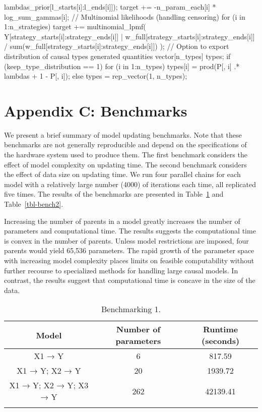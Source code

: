 \documentclass[
  11pt,
  article]{jss}
\begin{document}
\begin{CodeChunk}
\begin{CodeOutput}
{{                             lambdas_prior[l_starts[i]:l_ends[i]]);
    target += -n_param_each[i] * log_sum_gammas[i];
  }
  // Multinomial likelihoods (handling censoring)
  for (i in 1:n_strategies) {
    target += multinomial_lpmf(
      Y[strategy_starts[i]:strategy_ends[i]] |
      w_full[strategy_starts[i]:strategy_ends[i]] /
      sum(w_full[strategy_starts[i]:strategy_ends[i]])
    );
  }
}
// Option to export distribution of causal types
generated quantities {
  vector[n_types] types;
  if (keep_type_distribution == 1) {
    for (i in 1:n_types) {
      types[i] = prod(P[, i] .* lambdas + 1 - P[, i]);
    }
  } else {
    types = rep_vector(1, n_types);
  }
}
\end{CodeOutput}
\end{CodeChunk}

\newpage{}

\section*{Appendix C: Benchmarks}\label{sec-benchmark}

We present a brief summary of model updating benchmarks. Note that these
benchmarks are not generally reproducible and depend on the
specifications of the hardware system used to produce them. The first
benchmark considers the effect of model complexity on updating time. The
second benchmark considers the effect of data size on updating time. We
run four parallel chains for each model with a relatively large number
(4000) of iterations each time, all replicated five times. The results
of the benchmarks are presented in Table~\ref{tbl-bench1} and
Table~\ref{tbl-bench2}.

Increasing the number of parents in a model greatly increases the number
of parameters and computational time. The results suggests the
computational time is convex in the number of parents. Unless model
restrictions are imposed, four parents would yield 65,536 parameters.
The rapid growth of the parameter space with increasing model complexity
places limits on feasible computability without further recourse to
specialized methods for handling large causal models. In contrast, the
results suggest that computational time is concave in the size of the
data.

\begin{longtable}{ccc}

\toprule
Model & Number of parameters & Runtime (seconds)\\
\midrule
X1 → Y & 6 & 817.59\\
X1 → Y; X2 → Y & 20 & 1939.72\\
X1 → Y; X2 → Y; X3 → Y & 262 & 42139.41\\
\bottomrule


\caption{\label{tbl-bench1}Benchmarking 1.}

\tabularnewline
\end{longtable}
\end{document}
